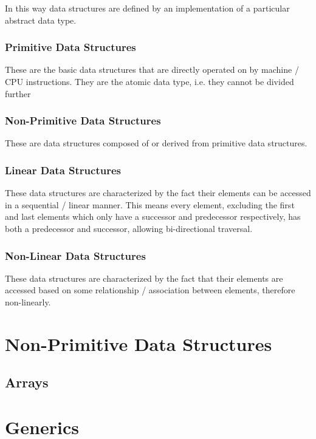 \documentclass[12pt letter]{report}
\begin{document}
In this way data structures are defined by an implementation of a particular abstract data type.


\subsubsection{Primitive Data Structures}

These are the basic data structures that are directly operated on by machine / CPU instructions. They are the atomic
data type, i.e. they cannot be divided further

\subsubsection{Non-Primitive Data Structures}

These are data structures composed of or derived from primitive data structures.

\subsubsection{Linear Data Structures}

These data structures are characterized by the fact their elements can be accessed in a sequential / linear manner. This
means every element, excluding the first and last elements which only have a successor and predecessor respectively, has
both a predecessor and successor, allowing bi-directional traversal.

\subsubsection{Non-Linear Data Structures}

These data structures are characterized by the fact that their elements are accessed based on some relationship /
association between elements, therefore non-linearly.

\section{Non-Primitive Data Structures}

\subsection{Arrays}


\section{Generics}


\end{document}
